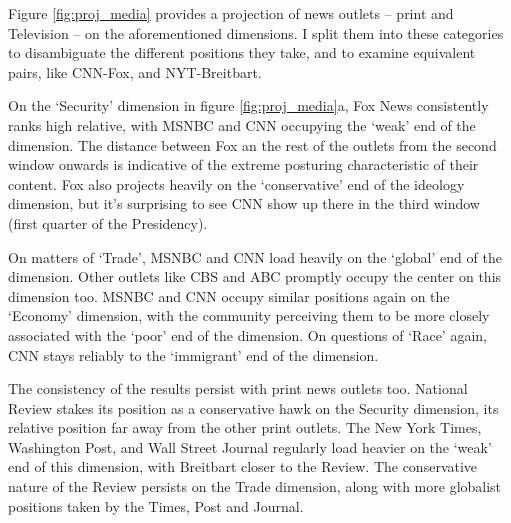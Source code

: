 Figure \ref{fig:proj_media} provides a projection of news outlets -- print and Television -- on the aforementioned dimensions. I split them into these categories to disambiguate the different positions they take, and to examine equivalent pairs, like CNN-Fox, and NYT-Breitbart.

On the `Security' dimension in figure \ref{fig:proj_media}a, Fox News consistently ranks high relative, with MSNBC and CNN occupying the `weak' end of the dimension. The distance between Fox an the rest of the outlets from the second window onwards is indicative of the extreme posturing characteristic of their content. Fox also projects heavily on the `conservative' end of the ideology dimension, but it's surprising to see CNN show up there in the third window (first quarter of the Presidency).  

On matters of `Trade', MSNBC and CNN load heavily on the `global' end of the dimension. Other outlets like CBS and ABC promptly occupy the center on this dimension too. MSNBC and CNN occupy similar positions again on the `Economy' dimension, with the community perceiving them to be more closely associated with the `poor' end of the dimension. On questions of `Race' again, CNN stays reliably to the `immigrant' end of the dimension.

The consistency of the results persist with print news outlets too. National Review stakes its position as a conservative hawk on the Security dimension, its relative position far away from the other print outlets. The New York Times, Washington Post, and Wall Street Journal regularly load heavier on the `weak' end of this dimension, with Breitbart closer to the Review. The conservative nature of the Review persists on the Trade dimension, along with more globalist positions taken by the Times, Post and Journal.


